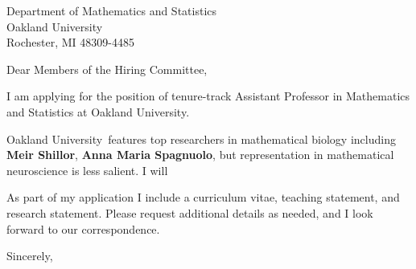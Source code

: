 \documentclass[11pt,a4paper]{letter}
\begin{document}

\def\School{Oakland University}

\begin{letter}
{Department of Mathematics and Statistics\\
Oakland University\\
Rochester, MI 48309-4485
}


\opening{Dear Members of the Hiring Committee,}

I am applying for the position of tenure-track Assistant Professor in Mathematics and Statistics at \School. 



\School~features top researchers in mathematical biology including \textbf{Meir Shillor}, \textbf{Anna Maria Spagnuolo}, but representation in mathematical neuroscience is less salient. I will 



As part of my application I include a curriculum vitae, teaching statement, and research statement. Please request additional details as needed, and I look forward to our correspondence.

\closing{Sincerely,}
\end{letter}
\end{document}
